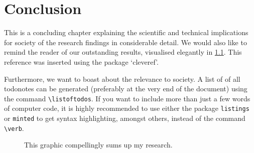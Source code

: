 \chapter{Conclusion}
\label{sec: conclusion}

This is a concluding chapter explaining the scientific and technical
implications for society of the research findings in considerable detail.
We would also like to remind the reader of our outstanding results, visualised elegantly in \cref{fig:posterchild}. This reference was inserted using the package `cleveref'.

Furthermore, we want to boast about the relevance to society.
A list of of all todonotes can be generated (preferably at the very end of the document) using the command \verb|\listoftodos|. If you want to include more than just a few words of computer code, it is highly recommended to use either the package \texttt{listings} or \texttt{minted} to get syntax highlighting, amongst others, instead of the command \verb|\verb|.
 
\begin{figure}
  \caption{This graphic compellingly sums up my research.}
  \label{fig:posterchild}
\end{figure}
